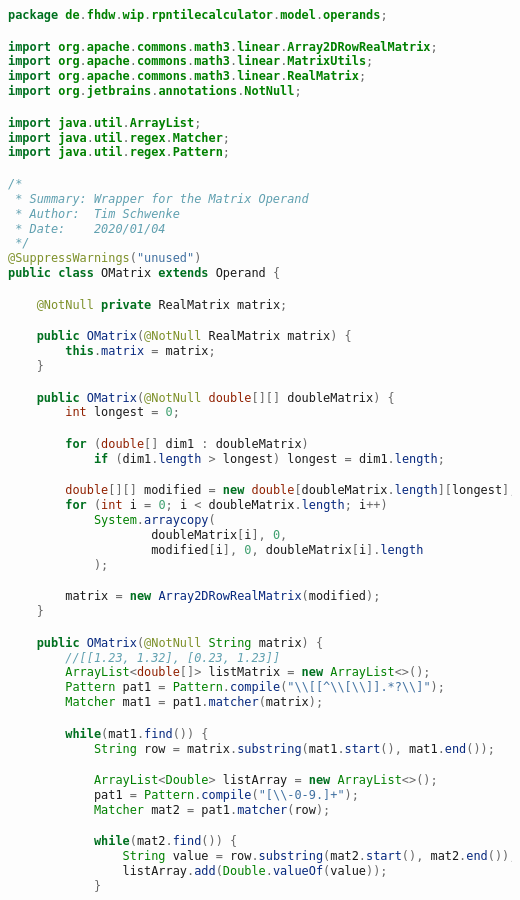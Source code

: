 \begin{lstlisting}[caption=OMatrix (Schwenke),label=list:OMatrix,language=Java]
package de.fhdw.wip.rpntilecalculator.model.operands;

import org.apache.commons.math3.linear.Array2DRowRealMatrix;
import org.apache.commons.math3.linear.MatrixUtils;
import org.apache.commons.math3.linear.RealMatrix;
import org.jetbrains.annotations.NotNull;

import java.util.ArrayList;
import java.util.regex.Matcher;
import java.util.regex.Pattern;

/*
 * Summary: Wrapper for the Matrix Operand
 * Author:  Tim Schwenke
 * Date:    2020/01/04
 */
@SuppressWarnings("unused")
public class OMatrix extends Operand {

    @NotNull private RealMatrix matrix;

    public OMatrix(@NotNull RealMatrix matrix) {
        this.matrix = matrix;
    }

    public OMatrix(@NotNull double[][] doubleMatrix) {
        int longest = 0;

        for (double[] dim1 : doubleMatrix)
            if (dim1.length > longest) longest = dim1.length;

        double[][] modified = new double[doubleMatrix.length][longest];
        for (int i = 0; i < doubleMatrix.length; i++)
            System.arraycopy(
                    doubleMatrix[i], 0,
                    modified[i], 0, doubleMatrix[i].length
            );

        matrix = new Array2DRowRealMatrix(modified);
    }

    public OMatrix(@NotNull String matrix) {
        //[[1.23, 1.32], [0.23, 1.23]]
        ArrayList<double[]> listMatrix = new ArrayList<>();
        Pattern pat1 = Pattern.compile("\\[[^\\[\\]].*?\\]");
        Matcher mat1 = pat1.matcher(matrix);

        while(mat1.find()) {
            String row = matrix.substring(mat1.start(), mat1.end());

            ArrayList<Double> listArray = new ArrayList<>();
            pat1 = Pattern.compile("[\\-0-9.]+");
            Matcher mat2 = pat1.matcher(row);

            while(mat2.find()) {
                String value = row.substring(mat2.start(), mat2.end());
                listArray.add(Double.valueOf(value));
            }


\end{lstlisting}
